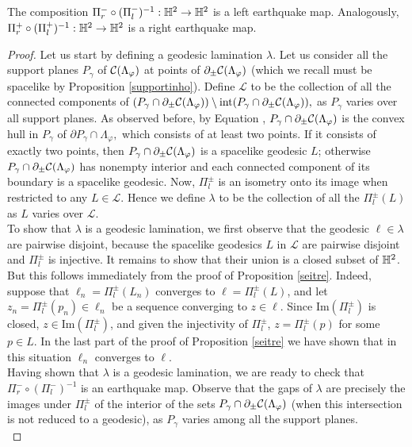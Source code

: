\begin{proposition}\label{seicinque}
    The composition $\Pi_r^-\circ(\Pi_l^-)^{-1}:\mathbb{H}^2\to\mathbb{H}^{2}$ is a left earthquake map. Analogously, $\Pi_r^+\circ(\Pi_l^+)^{-1}:\mathbb{H}^2\to\mathbb{H}^2$ is a right earthquake map.
\end{proposition}
\begin{proof}
    Let us start by defining a geodesic lamination $\lambda.$ Let us consider all the support planes $P_\gamma$ of $\mathcal{C}(\Lambda_\varphi)$ at points of $\partial_\pm\mathcal{C}(\Lambda_\varphi)$ (which we recall must be spacelike by Proposition \ref{supportinho}). Define $\mathcal{L}$ to be the collection of all the connected components of $(P_\gamma\cap\partial_\pm\mathcal{C}(\Lambda_\varphi))\setminus\text{int}(P_\gamma\cap\partial_\pm\mathcal{C}(\Lambda_\varphi)),$ as $P_\gamma$ varies over all support planes. As observed before, by Equation , $P_\gamma\cap \partial_\pm\mathcal{C}(\Lambda_\varphi)$ is the convex hull in $P_\gamma$ of $\partial P_\gamma\cap\Lambda_\varphi,$ which consists of at least two points. If it consists of exactly two points, then $P_\gamma\cap \partial_\pm\mathcal{C}(\Lambda_\varphi)$ is a spacelike geodesic $L$; otherwise $P_\gamma\cap\partial_\pm\mathcal{C}(\Lambda_\varphi)$ has nonempty interior and each connected component of its boundary is a spacelike geodesic. Now, $\Pi_l^\pm$ is an isometry onto its image when restricted to any $L\in\mathcal{L}.$ Hence we define $\lambda$ to be the collection of all the $\Pi_l^\pm(L)$ as $L$ varies over $\mathcal{L}$. \\
    To show that $\lambda$ is a geodesic lamination, we first observe that the geodesic $\ell\in\lambda$ are pairwise disjoint, because the spacelike geodesics $L$ in $\mathcal{L}$ are pairwise disjoint and $\Pi_l^\pm$ is injective. It remains to show that their union is a closed subset of $\mathbb{H}^2$. But this follows immediately from the proof of Proposition \ref{seitre}. Indeed, suppose that $\ell_n=\Pi_l^\pm(L_n)$ converges to $\ell=\Pi_l^\pm(L)$, and let $z_n=\Pi_l^\pm(p_n)\in\ell_n$ be a sequence converging to $z\in\ell$. Since $\text{Im}(\Pi_l^\pm)$ is closed, $z\in\text{Im}(\Pi_l^\pm)$, and given the injectivity of $\Pi_l^\pm$, $z=\Pi_l^\pm(p)$ for some $p\in L$. In the last part of the proof of Proposition \ref{seitre} we have shown that in this situation $\ell_n$ converges to $\ell$. \\
    Having shown that $\lambda$ is a geodesic lamination, we are ready to check that $\Pi_r^-\circ(\Pi_l^-)^{-1}$ is an earthquake map. Observe that the gaps of $\lambda$ are precisely the images under $\Pi_l^\pm$ of the interior of the sets $P_\gamma\cap\partial_\pm\mathcal{C}(\Lambda_\varphi)$ (when this intersection is not reduced to a geodesic), as $P_\gamma$ varies among all the support planes. \\

\end{proof}
